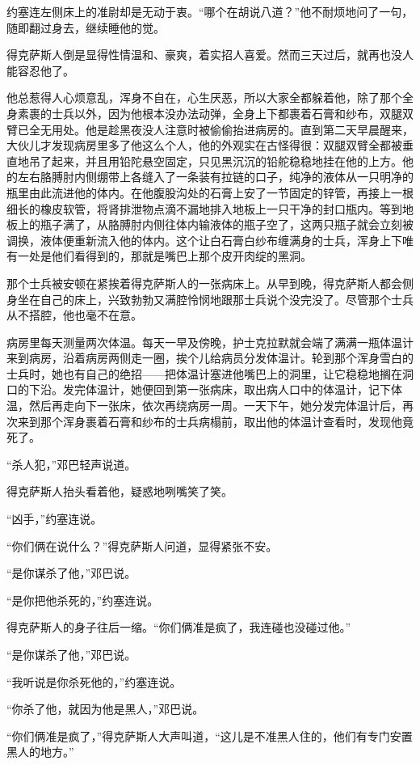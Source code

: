 约塞连左侧床上的准尉却是无动于衷。“哪个在胡说八道？”他不耐烦地问了一句，随即翻过身去，继续睡他的觉。

得克萨斯人倒是显得性情温和、豪爽，着实招人喜爱。然而三天过后，就再也没人能容忍他了。

他总惹得人心烦意乱，浑身不自在，心生厌恶，所以大家全都躲着他，除了那个全身素裹的士兵以外，因为他根本没办法动弹，全身上下都裹着石膏和纱布，双腿双臂已全无用处。他是趁黑夜没人注意时被偷偷抬进病房的。直到第二天早晨醒来，大伙儿才发现病房里多了他这么个人，他的外观实在古怪得很：双腿双臂全都被垂直地吊了起来，并且用铅陀悬空固定，只见黑沉沉的铅舵稳稳地挂在他的上方。他的左右胳膊肘内侧绷带上各缝入了一条装有拉链的口子，纯净的液体从一只明净的瓶里由此流进他的体内。在他腹股沟处的石膏上安了一节固定的锌管，再接上一根细长的橡皮软管，将肾排泄物点滴不漏地排入地板上一只干净的封口瓶内。等到地板上的瓶子满了，从胳膊肘内侧往体内输液体的瓶子空了，这两只瓶子就会立刻被调换，液体便重新流入他的体内。这个让白石膏白纱布缠满身的士兵，浑身上下唯有一处是他们看得到的，那就是嘴巴上那个皮开肉绽的黑洞。

那个士兵被安顿在紧挨着得克萨斯人的一张病床上。从早到晚，得克萨斯人都会侧身坐在自己的床上，兴致勃勃又满腔怜悯地跟那士兵说个没完没了。尽管那个士兵从不搭腔，他也毫不在意。

病房里每天测量两次体温。每天一早及傍晚，护士克拉默就会端了满满一瓶体温计来到病房，沿着病房两侧走一圈，挨个儿给病员分发体温计。轮到那个浑身雪白的士兵时，她也有自己的绝招——把体温计塞进他嘴巴上的洞里，让它稳稳地搁在洞口的下沿。发完体温计，她便回到第一张病床，取出病人口中的体温计，记下体温，然后再走向下一张床，依次再绕病房一周。一天下午，她分发完体温计后，再次来到那个浑身裹着石膏和纱布的士兵病榻前，取出他的体温计查看时，发现他竟死了。

“杀人犯，”邓巴轻声说道。

得克萨斯人抬头看着他，疑惑地咧嘴笑了笑。

“凶手，”约塞连说。

“你们俩在说什么？”得克萨斯人问道，显得紧张不安。

“是你谋杀了他，”邓巴说。

“是你把他杀死的，”约塞连说。

得克萨斯人的身子往后一缩。“你们俩准是疯了，我连碰也没碰过他。”

“是你谋杀了他，”邓巴说。

“我听说是你杀死他的，”约塞连说。

“你杀了他，就因为他是黑人，”邓巴说。

“你们俩准是疯了，”得克萨斯人大声叫道，“这儿是不准黑人住的，他们有专门安置黑人的地方。”

